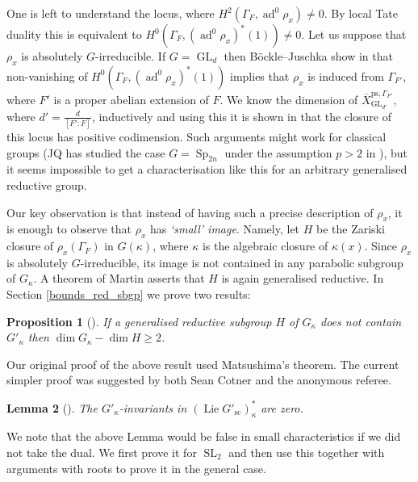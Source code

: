 \documentclass{amsart}
\newtheorem{prop}{Proposition}[section]
\newtheorem{lem}[prop]{Lemma}
\theoremstyle{definition}
\theoremstyle{remark}
\DeclareMathOperator{\GL}{GL}
\DeclareMathOperator{\SL}{SL}
\DeclareMathOperator{\Sp}{Sp}
\DeclareMathOperator{\ad}{ad}
\newcommand{\ps}{\mathrm{ps}}
\newcommand{\Xbar}{\overline{X}}
\DeclareMathOperator{\Lie}{Lie}
\newcommand{\sic}{\operatorname{sc}}
\begin{document}
One is left to understand the locus, where $H^2(\Gamma_F, \ad^0\rho_x)\neq 0$. 
By local Tate duality this is equivalent to 
$H^0(\Gamma_F, (\ad^0 \rho_x)^*(1))\neq 0$. Let us suppose that $\rho_x$ 
is absolutely $G$-irreducible.  If $G=\GL_d$ then B\"ockle--Juschka show in \cite{BJ_new} 
that non-vanishing of $H^0(\Gamma_F, (\ad^0 \rho_x)^*(1))$ implies that 
$\rho_x$ is induced from $\Gamma_{F'}$, where $F'$ is a proper
abelian extension of $F$. We know the dimension of 
$\Xbar^{\ps, \Gamma_{F'}}_{\GL_{d'}}$, where $d'=\frac{d}{[F':F]}$, inductively and 
using this it is shown 
in \cite{BIP_new} that the closure of this locus has positive codimension.
Such arguments might work for classical groups (JQ has studied the case
$G=\Sp_{2n}$ under the assumption $p>2$ in \cite[Section 7]{quast}), but it seems impossible 
to get  a characterisation like this for an arbitrary generalised 
reductive group. 

Our key observation is that instead of having such a precise description of $\rho_x$, it is enough to observe that $\rho_x$ has \emph{`small' image}. Namely, 
let $H$ be the Zariski closure of $\rho_x(\Gamma_F)$ in 
$G(\kappa)$, where $\kappa$ is the algebraic closure of $\kappa(x)$. Since $\rho_x$ is absolutely $G$-irreducible, its image is not contained in any parabolic subgroup of $G_{\kappa}$. A theorem of Martin 
\cite{martin} asserts that $H$ is again generalised reductive. 
In Section \ref{bounds_red_sbgp} we prove two results:  
\begin{prop}[]\label{intro_matsu} If a generalised reductive subgroup $H$ of 
$G_{\kappa}$ does not contain $G'_{\kappa}$ then $\dim G_{\kappa} -\dim H\ge 2$.
\end{prop} 

Our original  proof of the above result used Matsushima's theorem.
The current simpler proof was suggested by both  Sean Cotner and the anonymous referee. 

\begin{lem}[]\label{intro_coadjoint} The $G'_{\kappa}$-invariants in $(\Lie G'_{\sic})^*_{\kappa}$ are zero. 
\end{lem}


We note that the above Lemma would be false in small characteristics if we did 
not take the dual. We first prove it for $\SL_2$ and then use this together with 
arguments with roots to prove it in 
the general case. 
\end{document}
